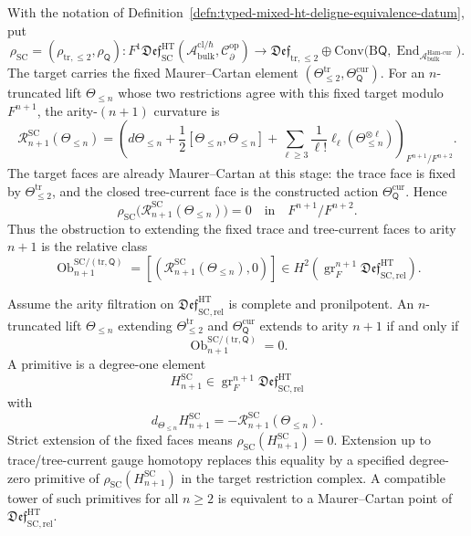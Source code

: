 \begin{defn}
\label{defn:relative-swiss-cheese-extension-obstruction}
With the notation of
Definition~\ref{defn:typed-mixed-ht-deligne-equivalence-datum}, put
\[
  \rho_{\mathrm{SC}}
  =
  (\rho_{\mathrm{tr},\le2},\rho_{\mathsf Q})
  \colon
  F^1\mathfrak{Def}^{\mathrm{HT}}_{\mathrm{SC}}
  (\mathcal A^{\mathrm{cl}/\hbar}_{\mathrm{bulk}},
   \mathcal C^{\mathrm{op}}_\partial)
  \longrightarrow
  \mathfrak{Def}_{\mathrm{tr},\le2}
  \oplus
  \mathrm{Conv}\bigl(\mathrm B\mathsf Q,
    \operatorname{End}_{\mathcal A^{\mathrm{Ham\mbox{-}cur}}_{\mathrm{bulk}}}
  \bigr).
\]
The target carries the fixed Maurer--Cartan element
\((\Theta^{\mathrm{tr}}_{\le2},\Theta_{\mathsf Q}^{\mathrm{cur}})\).
For an \(n\)-truncated lift
\(\Theta_{\le n}\) whose two restrictions agree with this fixed target
modulo \(F^{n+1}\), the arity-\((n+1)\) curvature is
\[
  \mathcal R^{\mathrm{SC}}_{n+1}(\Theta_{\le n})
  =
  \left(
  d\Theta_{\le n}
  +\frac12[\Theta_{\le n},\Theta_{\le n}]
  +\sum_{\ell\ge3}\frac1{\ell!}
    \ell_\ell(\Theta_{\le n}^{\otimes\ell})
  \right)_{F^{n+1}/F^{n+2}} .
\]
The target faces are already Maurer--Cartan at this stage: the trace
face is fixed by \(\Theta^{\mathrm{tr}}_{\le2}\), and the closed
tree-current face is the constructed action
\(\Theta_{\mathsf Q}^{\mathrm{cur}}\).  Hence
\[
  \rho_{\mathrm{SC}}
  \bigl(\mathcal R^{\mathrm{SC}}_{n+1}(\Theta_{\le n})\bigr)=0
  \quad\text{in}\quad F^{n+1}/F^{n+2}.
\]
Thus the obstruction to extending the fixed trace and tree-current faces
to arity \(n+1\) is the relative class
\[
  \operatorname{Ob}^{\mathrm{SC}/(\mathrm{tr},\mathsf Q)}_{n+1}
  =
  [(\mathcal R^{\mathrm{SC}}_{n+1}(\Theta_{\le n}),0)]
  \in
  H^2\!\left(
    \operatorname{gr}^{n+1}_{F}
    \mathfrak{Def}^{\mathrm{HT}}_{\mathrm{SC,rel}}
  \right).
\]
\end{defn}

\begin{prop}
\label{prop:relative-swiss-cheese-extension-criterion}
Assume the arity filtration on
\(\mathfrak{Def}^{\mathrm{HT}}_{\mathrm{SC,rel}}\) is complete and
pronilpotent.  An \(n\)-truncated lift \(\Theta_{\le n}\) extending
\(\Theta^{\mathrm{tr}}_{\le2}\) and
\(\Theta_{\mathsf Q}^{\mathrm{cur}}\) extends to arity \(n+1\) if and
only if
\[
  \operatorname{Ob}^{\mathrm{SC}/(\mathrm{tr},\mathsf Q)}_{n+1}=0 .
\]
A primitive is a degree-one element
\[
  H^{\mathrm{SC}}_{n+1}
  \in
  \operatorname{gr}^{n+1}_{F}
  \mathfrak{Def}^{\mathrm{HT}}_{\mathrm{SC,rel}}
\]
with
\[
  d_{\Theta_{\le n}}H^{\mathrm{SC}}_{n+1}
  =
  -\mathcal R^{\mathrm{SC}}_{n+1}(\Theta_{\le n}).
\]
Strict extension of the fixed faces means
\(\rho_{\mathrm{SC}}(H^{\mathrm{SC}}_{n+1})=0\).  Extension up to
trace/tree-current gauge homotopy replaces this equality by a specified
degree-zero primitive of \(\rho_{\mathrm{SC}}(H^{\mathrm{SC}}_{n+1})\)
in the target restriction complex.  A compatible tower of such
primitives for all \(n\ge2\) is equivalent to a Maurer--Cartan point of
\(\mathfrak{Def}^{\mathrm{HT}}_{\mathrm{SC,rel}}\).
\end{prop}

